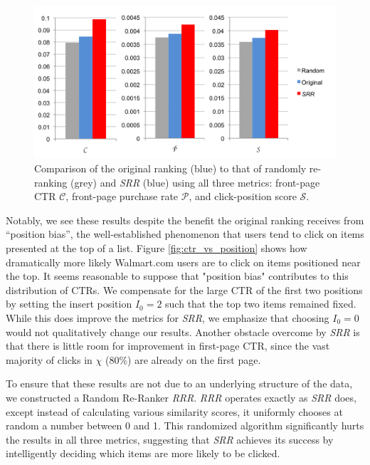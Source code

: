 \documentclass{article}
\begin{document}
\begin{figure}[htbp!]
    \centering
    \includegraphics[width=\textwidth]{moneyshot.png}
    \caption{Comparison of the original ranking (blue) to that of randomly re-ranking (grey) and {\em SRR} (blue) using all three metrics: front-page CTR $\mathscr{C}$, front-page purchase rate $\mathscr{P}$, and click-position score $\mathscr{S}$.}
    \label{fig:compare_metric_performance}
\end{figure}

Notably, we see these results despite the benefit the original ranking receives
from “position bias”, the well-established phenomenon that users tend to click
on items presented at the top of a list. Figure \ref{fig:ctr_vs_position} shows
how dramatically more likely Walmart.com users are to click on items positioned
near the top. It seems reasonable to suppose that "position bias" contributes
to this distribution of CTRs. We compensate for the large CTR of the first two
positions by setting the insert position $I_0 = 2$ such that the top two items
remained fixed. While this does improve the metrics for {\em SRR}, we emphasize
that choosing $I_0 = 0$ would not qualitatively change our results. Another
obstacle overcome by {\em SRR} is that there is little room for improvement in
first-page CTR, since the vast majority of clicks in $\chi$ (80\%) are already
on the first page.

To ensure that these results are not due to an underlying structure of the
data, we constructed a Random Re-Ranker {\em RRR}. {\em RRR} operates exactly
as {\em SRR} does, except instead of calculating various similarity scores, it
uniformly chooses at random a number between 0 and 1. This randomized algorithm
significantly hurts the results in all three metrics, suggesting that {\em SRR}
achieves its success by intelligently deciding which items are more likely to
be clicked. 
\end{document}
